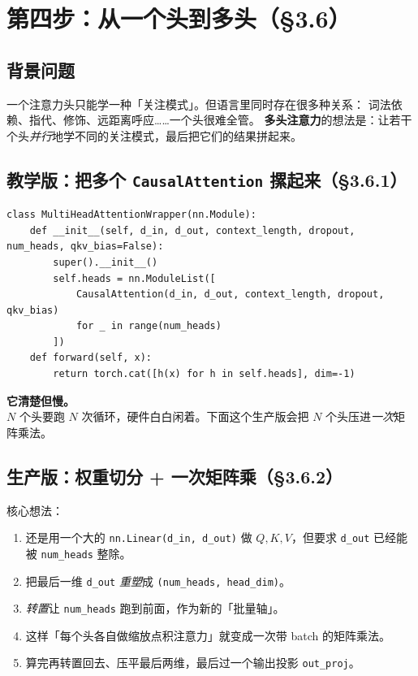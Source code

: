 \documentclass[11pt,a4paper]{ctexart}
\begin{document}
\section{第四步：从一个头到多头（§3.6）}

\subsection{背景问题}

一个注意力头只能学一种「关注模式」。但语言里同时存在很多种关系：
词法依赖、指代、修饰、远距离呼应……一个头很难全管。
\textbf{多头注意力}的想法是：让若干个头\emph{并行}地学不同的关注模式，最后把它们的结果拼起来。

\subsection{教学版：把多个 \texttt{CausalAttention} 摞起来（§3.6.1）}

\begin{codebox}
\begin{lstlisting}
class MultiHeadAttentionWrapper(nn.Module):
    def __init__(self, d_in, d_out, context_length, dropout, num_heads, qkv_bias=False):
        super().__init__()
        self.heads = nn.ModuleList([
            CausalAttention(d_in, d_out, context_length, dropout, qkv_bias)
            for _ in range(num_heads)
        ])
    def forward(self, x):
        return torch.cat([h(x) for h in self.heads], dim=-1)
\end{lstlisting}
\end{codebox}

\begin{intuitionblock}
\textbf{它清楚但慢。}\\
$N$ 个头要跑 $N$ 次循环，硬件白白闲着。下面这个生产版会把 $N$ 个头压进\emph{一次}矩阵乘法。
\end{intuitionblock}

\subsection{生产版：权重切分 + 一次矩阵乘（§3.6.2）}

核心想法：

\begin{enumerate}
  \item 还是用一个大的 \texttt{nn.Linear(d\_in, d\_out)} 做 $Q, K, V$，但要求 \texttt{d\_out} 已经能被 \texttt{num\_heads} 整除。
  \item 把最后一维 \texttt{d\_out} \emph{重塑}成 \texttt{(num\_heads, head\_dim)}。
  \item \emph{转置}让 \texttt{num\_heads} 跑到前面，作为新的「批量轴」。
  \item 这样「每个头各自做缩放点积注意力」就变成一次带 batch 的矩阵乘法。
  \item 算完再转置回去、压平最后两维，最后过一个输出投影 \texttt{out\_proj}。
\end{enumerate}
\end{document}

